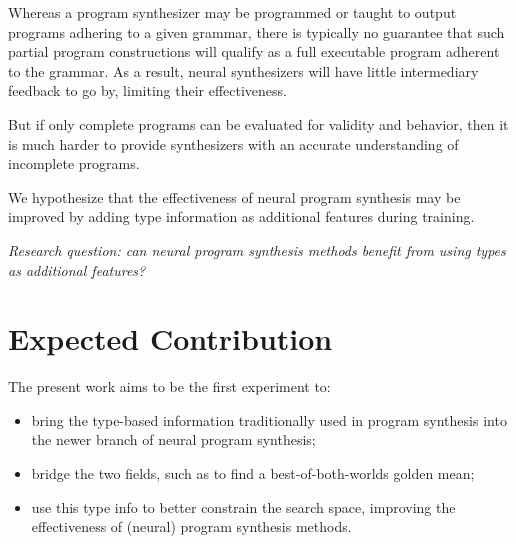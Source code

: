 \documentclass{article}
\begin{document}
Whereas a program synthesizer may be programmed or taught to output programs adhering to a given grammar, there is typically no guarantee that such partial program constructions will qualify as a full executable program adherent to the grammar.
As a result, neural synthesizers will have little intermediary feedback to go by, limiting their effectiveness.

But if only complete programs can be evaluated for validity and behavior, then 
it is much harder to provide synthesizers with an accurate understanding of incomplete programs.

We hypothesize that the effectiveness of neural program synthesis may be improved by 
adding type information as additional features during training.



\emph{Research question: can neural program synthesis methods benefit from using types as additional features?}

\section{Expected Contribution}

The present work aims to be the first experiment to:
\begin{itemize}
    \item bring the type-based information traditionally used in program synthesis into the newer branch of neural program synthesis;
    \item bridge the two fields, such as to find a best-of-both-worlds golden mean;
    \item use this type info to better constrain the search space, improving the effectiveness of (neural) program synthesis methods. 
\end{itemize}
\end{document}
